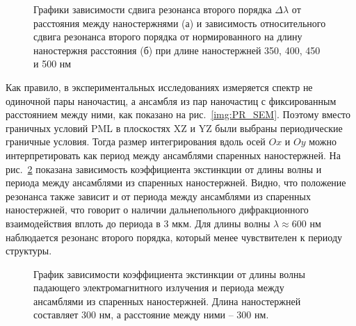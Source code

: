 \begin{figure}
\caption{Графики зависимости сдвига резонанса второго порядка $ \Delta \lambda $ от расстояния между наностержнями (а) и зависимость относительного сдвига резонанса второго порядка от нормированного на длину  наностержня расстояния (б) при длине наностержней 350, 400, 450 и 500 нм }
\label{img:ruler2}
\end{figure}

Как правило, в экспериментальных исследованиях измеряется спектр не одиночной пары наночастиц, а ансамбля из пар наночастиц с фиксированным расстоянием между ними, как показано на рис.~\ref{img:PR_SEM}. Поэтому вместо граничных условий PML в плоскостях XZ и YZ были выбраны периодические граничные условия. Тогда размер интегрирования вдоль осей $ Ox $ и $ Oy $ можно интерпретировать как период между ансамблями спаренных наностержней. На рис.~\ref{img:BCperiod} показана зависимость коэффициента экстинкции от длины волны и периода между ансамблями из спаренных наностержней. Видно, что положение резонанса также зависит и от периода между ансамблями из спаренных наностержней, что говорит о наличии дальнепольного дифракционного взаимодействия  вплоть до периода в 3 мкм. Для длины волны $ \lambda \approx 600$ нм наблюдается резонанс второго порядка, который менее чувствителен к периоду структуры.

\begin{figure}
\caption{График зависимости коэффициента экстинкции от длины волны падающего электромагнитного излучения и периода между ансамблями из спаренных наностержней. Длина наностержней составляет 300 нм, а расстояние между ними -- 300 нм.}
\label{img:BCperiod}
\end{figure}

